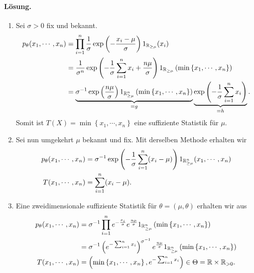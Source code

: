 \paragraph*{Lösung.}
\begin{enumerate}
    \item Sei $\sigma>0$ fix und bekannt. 
        \begin{align*}
            p_\theta (x_1, \cdots, x_n) &= \prod_{i=1}^{n} 
            \frac{1}{\sigma} \exp \left(-\frac{x_i-\mu}{\sigma} \right) 1_{\mathbb R_{\geq\mu}}(x_i) \\
            &= \frac{1}{\sigma^n} \exp \left( -\frac{1}{\sigma} \sum_{i=1}^{n} x_i + \frac{n\mu}{\sigma} \right)
            1_{\mathbb R_{\geq \mu}}\left( \min \left\{ x_1, \cdots, x_n \right\} \right)  \\
            &= \underbrace{
            \sigma^{-1} \exp \left( \frac{n\mu}{\sigma} \right) 
            1_{\mathbb R^n_{\geq \mu}}\left( \min \left\{ x_1, \cdots, x_n \right\} \right) }_{=g}
            \underbrace{\exp \left( -\frac{1}{\sigma} \sum_{i=1}^{n} x_i  \right) }_{=h}.
        \end{align*}
        Somit ist $T(X) = \min \left\{ x_1, \cdots, x_n \right\}$ eine suffiziente Statistik für $\mu$. 
    \item Sei nun umgekehrt $\mu$ bekannt und fix. Mit derselben Methode erhalten wir
        \begin{align*}
            p_\theta (x_1, \cdots, x_n) &= \sigma^{-1} 
            \exp \left( - \frac{1}{\sigma} \sum_{i=1}^{n} (x_i - \mu) \right) 1_{\mathbb R^{n}_{\geq \mu}} (x_1, \cdots, x_n) \\
            T(  x_1, \cdots, x_n) &= \sum_{i=1}^{n} (x_i - \mu). 
        \end{align*}
    \item Eine zweidimensionale suffiziente Statistik für $\theta = (\mu, \theta)$ erhalten wir aus
        \begin{align*}
            p_\theta(x_1, \cdots, x_n) &= \sigma^{-1} \prod_{i=1}^n e^{ -\frac{x_i}{\sigma}} e^{\frac{n\mu}{\sigma}}
            1_{\mathbb R^n_{\geq \mu}}\left( \min \left\{ x_1, \cdots, x_n \right\} \right) \\
            &= \sigma^{-1} \left( e^{- \sum_{i=1}^{n} x_i} \right)^{\sigma^{-1}} 
            e^{\frac{n\mu}{\sigma}}
            1_{\mathbb R^n_{\geq \mu}}\left( \min \left\{ x_1, \cdots, x_n \right\} \right) \\
            T( x_1, \cdots, x_n ) &= \left( \min \left\{ x_1, \cdots, x_n \right\}, 
            e^{-\sum_{i=1}^{n} x_i} \right) \in \Theta = \mathbb R \times \mathbb R_{>0}. 
        \end{align*}
\end{enumerate}




